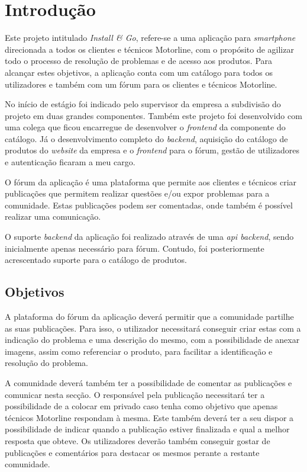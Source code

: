 
\chapter{Introdução}
Este projeto intitulado \textit{Install \& Go}, refere-se a uma aplicação para \textit{smartphone} direcionada a todos os clientes e 
técnicos Motorline, com o propósito de agilizar todo o processo de resolução de problemas e de acesso 
aos produtos. Para alcançar estes objetivos, a aplicação conta com um catálogo para todos os utilizadores 
e também com um fórum para os clientes e técnicos Motorline.

No início de estágio foi indicado pelo supervisor da empresa a subdivisão do projeto em duas grandes componentes. Também este projeto foi desenvolvido com uma colega que ficou encarregue de desenvolver o \textit{frontend} da componente do catálogo. Já o desenvolvimento completo do \textit{backend}, aquisição do catálogo de produtos do \textit{website} da empresa e o \textit{frontend} para o fórum, gestão de utilizadores e autenticação ficaram a meu cargo.

O fórum da aplicação é uma plataforma que permite aos clientes e técnicos criar publicações que permitem realizar questões e/ou expor problemas para a comunidade. Estas publicações podem ser comentadas, onde também é possível realizar uma comunicação.

O suporte \textit{backend} da aplicação foi realizado através de uma \textit{api backend}, sendo inicialmente apenas necessário para fórum. Contudo, foi posteriormente acrescentado suporte para o catálogo de produtos.

\newpage

\section{Objetivos}
A plataforma do fórum da aplicação deverá permitir que a comunidade partilhe as suas publicações. Para isso, o utilizador necessitará conseguir criar estas com a indicação do problema e uma descrição do mesmo, com a possibilidade de anexar imagens, assim como referenciar o produto, para facilitar a identificação e resolução do problema.

A comunidade deverá também ter a possibilidade de comentar as publicações e comunicar nesta secção. O responsável pela publicação necessitará ter a possibilidade de a colocar em privado caso tenha como objetivo que apenas técnicos Motorline respondam à mesma. Este também deverá ter a seu dispor a possibilidade de indicar quando a publicação estiver finalizada e qual a melhor resposta que obteve. Os utilizadores deverão também conseguir gostar de publicações e comentários para destacar os mesmos perante a restante comunidade.

